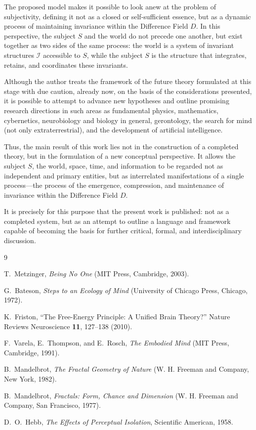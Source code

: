 \documentclass[aps,prd,onecolumn,nofootinbib,superscriptaddress]{revtex4-2}
\begin{document}
The proposed model makes it possible to look anew at the problem of subjectivity, defining it not as a closed or self-sufficient essence, but as a dynamic process of maintaining invariance within the Difference Field \(D\). In this perspective, the subject \(S\) and the world do not precede one another, but exist together as two sides of the same process: the world is a system of invariant structures \(\mathcal{I}\) accessible to \(S\), while the subject \(S\) is the structure that integrates, retains, and coordinates these invariants.

Although the author treats the framework of the future theory formulated at this stage with due caution, already now, on the basis of the considerations presented, it is possible to attempt to advance new hypotheses and outline promising research directions in such areas as fundamental physics, mathematics, cybernetics, neurobiology and biology in general, gerontology, the search for mind (not only extraterrestrial), and the development of artificial intelligence.

Thus, the main result of this work lies not in the construction of a completed theory, but in the formulation of a new conceptual perspective. It allows the subject \(S\), the world, space, time, and information to be regarded not as independent and primary entities, but as interrelated manifestations of a single process—the process of the emergence, compression, and maintenance of invariance within the Difference Field \(D\).

It is precisely for this purpose that the present work is published: not as a completed system, but as an attempt to outline a language and framework capable of becoming the basis for further critical, formal, and interdisciplinary discussion.


\begin{thebibliography}{9}

    T.~Metzinger,
    \textit{Being No One}
    (MIT Press, Cambridge, 2003).

    G.~Bateson,
    \textit{Steps to an Ecology of Mind}
    (University of Chicago Press, Chicago, 1972).

    K.~Friston,
    ``The Free-Energy Principle: A Unified Brain Theory?''
    Nature Reviews Neuroscience \textbf{11}, 127--138 (2010).

    F.~Varela, E.~Thompson, and E.~Rosch,
    \textit{The Embodied Mind}
    (MIT Press, Cambridge, 1991).

    B.~Mandelbrot,
    \textit{The Fractal Geometry of Nature}
    (W. H. Freeman and Company, New York, 1982).

    B.~Mandelbrot,
    \textit{Fractals: Form, Chance and Dimension}
    (W. H. Freeman and Company, San Francisco, 1977).

    D.~O.~Hebb,
    \textit{The Effects of Perceptual Isolation},
    Scientific American, 1958.
\end{thebibliography}
\end{document}
